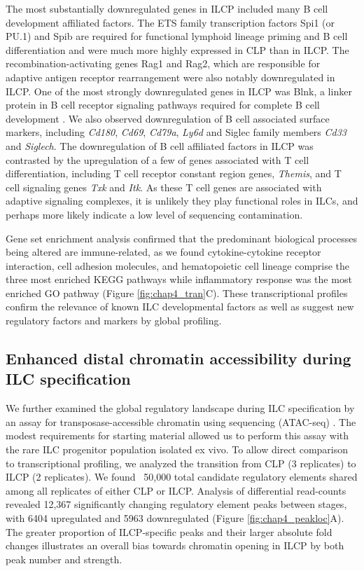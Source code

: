 The most substantially downregulated genes in ILCP included many B cell development affiliated factors. The ETS family transcription factors Spi1 (or PU.1) and Spib are required for functional lymphoid lineage priming and B cell differentiation and were much more highly expressed in CLP than in ILCP. The recombination-activating genes Rag1 and Rag2, which are responsible for adaptive antigen receptor rearrangement were also notably downregulated in ILCP. One of the most strongly downregulated genes in ILCP was Blnk, a linker protein in B cell receptor signaling pathways required for complete B cell development \cite{minegishi1999}. We also observed downregulation of B cell associated surface markers, including \textit{Cd180}, \textit{Cd69}, \textit{Cd79a}, \textit{Ly6d} and Siglec family members \textit{Cd33} and \textit{Siglech}. The downregulation of B cell affiliated factors in ILCP was contrasted by the upregulation of a few of genes associated with T cell differentiation, including T cell receptor constant region genes, \textit{Themis}, and T cell signaling genes \textit{Txk} and \textit{Itk}. As these T cell genes are associated with adaptive signaling complexes, it is unlikely they play functional roles in ILCs, and perhaps more likely indicate a low level of sequencing contamination.

Gene set enrichment analysis confirmed that the predominant biological processes being altered are immune-related, as we found cytokine-cytokine receptor interaction, cell adhesion molecules, and hematopoietic cell lineage comprise the three most enriched KEGG pathways while inflammatory response was the most enriched GO pathway (Figure \ref{fig:chap4_tran}C). These transcriptional profiles confirm the relevance of known ILC developmental factors as well as suggest new regulatory factors and markers by global profiling. 


\subsection{Enhanced distal chromatin accessibility during ILC specification}

We further examined the global regulatory landscape during ILC specification by an assay for transposase-accessible chromatin using sequencing (ATAC-seq) \cite{buenrostro2013}. The modest requirements for starting material allowed us to perform this assay with the rare ILC progenitor population isolated ex vivo. To allow direct comparison to transcriptional profiling, we analyzed the transition from CLP (3 replicates) to ILCP (2 replicates). We found ~50,000 total candidate regulatory elements shared among all replicates of either CLP or ILCP. Analysis of differential read-counts revealed 12,367 significantly changing regulatory element peaks between stages, with 6404 upregulated and 5963 downregulated (Figure \ref{fig:chap4_peakloc}A). The greater proportion of ILCP-specific peaks and their larger absolute fold changes illustrates an overall bias towards chromatin opening in ILCP by both peak number and strength. 

